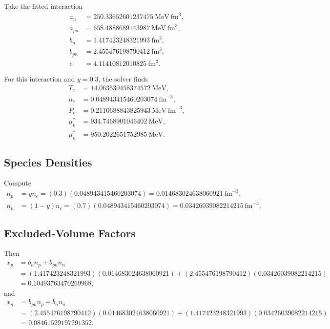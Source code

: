 \documentclass[11pt]{article}
\begin{document}
Take the fitted interaction
\begin{align}
a_n &= 250.33652601237475\ \mathrm{MeV\ fm}^3, \\
a_{pn} &= 658.4888689143987\ \mathrm{MeV\ fm}^3, \\
b_n &= 1.417423248321993\ \mathrm{fm}^3, \\
b_{pn} &= 2.455476198790412\ \mathrm{fm}^3, \\
c &= 4.11410812010825\ \mathrm{fm}^3.
\end{align}

For this interaction and $y=0.3$, the solver finds
\begin{align}
T_c &= 14.063530458374572\ \mathrm{MeV}, \\
n_c &= 0.048943415460203074\ \mathrm{fm}^{-3}, \\
P_c &= 0.2110688843825943\ \mathrm{MeV\ fm}^{-3}, \\
\mu_p^\ast &= 934.7468901046402\ \mathrm{MeV}, \\
\mu_n^\ast &= 950.2022651752985\ \mathrm{MeV}.
\end{align}

\subsection{Species Densities}

Compute
\begin{align}
n_p &= yn_c = (0.3)(0.048943415460203074)
= 0.014683024638060921\ \mathrm{fm}^{-3}, \\
n_n &= (1-y)n_c = (0.7)(0.048943415460203074)
= 0.03426039082214215\ \mathrm{fm}^{-3}.
\end{align}

\subsection{Excluded-Volume Factors}

Then
\begin{align}
x_p
&=
b_n n_p + b_{pn} n_n \\
&=
(1.417423248321993)(0.014683024638060921)
+(2.455476198790412)(0.03426039082214215) \\
&=
0.10493763470269968,
\end{align}
and
\begin{align}
x_n
&=
b_{pn} n_p + b_n n_n \\
&=
(2.455476198790412)(0.014683024638060921)
+(1.417423248321993)(0.03426039082214215) \\
&=
0.08461529197291352.
\end{align}
\end{document}
